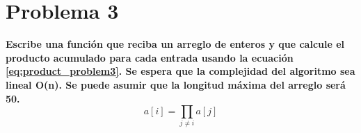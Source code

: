 \section*{Problema 3}
\textbf{Escribe una función que reciba un arreglo de enteros y que calcule el producto acumulado para cada entrada usando la ecuación \ref{eq:product_problem3}. Se espera que la complejidad del algoritmo sea lineal O(n). Se puede asumir que la longitud máxima del arreglo será 50.}
\begin{equation}
    a[i] = \prod_{j\neq i} a[j]
    \label{eq:product_problem3}
\end{equation}